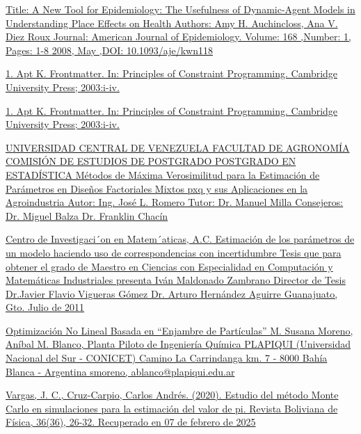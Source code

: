 \documentclass{article}
\begin{document}
\begin{itemize}
\begin{thebibliography}
     \bibitem[13]{}  \href{ https://doi.org/10.1093/aje/kwn118}{Title: A New Tool for Epidemiology: The Usefulness of Dynamic-Agent Models in Understanding Place Effects on Health Authors: Amy H. Auchincloss, Ana V. Diez Roux Journal: American Journal of Epidemiology. Volume: 168 ,Number: 1, Pages: 1-8 2008,  May ,DOI: 10.1093/aje/kwn118}
    \label{sec:23}

    \bibitem[15]{}  \href{https://www.cambridge.org/core/books/principles-of-constraint-programming/C008FB32571F66C3EE0EEEBDE1F98A7D}{1. Apt K. Frontmatter. In: Principles of Constraint Programming. Cambridge University Press; 2003:i-iv.}
    \label{sec:24}

    \bibitem[15]{}  \href{https://www.cambridge.org/core/books/principles-of-constraint-programming/C008FB32571F66C3EE0EEEBDE1F98A7D}{1. Apt K. Frontmatter. In: Principles of Constraint Programming. Cambridge University Press; 2003:i-iv.}
    \label{sec:25}

    \bibitem[16]{}  \href{http://saber.ucv.ve/bitstream/10872/14678/1/T026800014698-0-FinalDefensa_JoseLuisRomero-000.pdf}{UNIVERSIDAD CENTRAL DE VENEZUELA FACULTAD DE AGRONOMÍA COMISIÓN DE ESTUDIOS DE POSTGRADO POSTGRADO EN ESTADÍSTICA Métodos de Máxima Verosimilitud para la Estimación de Parámetros en Diseños
    Factoriales Mixtos pxq y sus Aplicaciones en la Agroindustria  Autor: Ing. José L. Romero Tutor: Dr. Manuel Milla Consejeros: Dr. Miguel Balza Dr. Franklin Chacín}
    \label{sec:26}

    \bibitem[17]{}\href{https://cimat.repositorioinstitucional.mx/jspui/bitstream/1008/255/2/TE%20388.pdf}{Centro de Investigaci´on en Matem´aticas, A.C. Estimación de los parámetros de un modelo haciendo uso de correspondencias con incertidumbre Tesis que para obtener el grado de Maestro en Ciencias con Especialidad en Computación y Matemáticas Industriales presenta Iván Maldonado Zambrano Director de Tesis Dr.Javier Flavio Vigueras Gómez Dr. Arturo Hernández Aguirre Guanajuato, Gto. Julio de 2011}
    \label{sec:27}

    \bibitem[18]  {}\href{https://cimat.repositorioinstitucional.mx/jspui/bitstream/1008/255/2/TE%20388.pdf}{Optimización No Lineal Basada en “Enjambre de Partículas” M. Susana Moreno, Aníbal M. Blanco, Planta Piloto de Ingeniería Química PLAPIQUI (Universidad Nacional del Sur - CONICET) Camino La Carrindanga km. 7 - 8000 Bahía Blanca - Argentina {smoreno, ablanco}@plapiqui.edu.ar}
    \label{sec:28}

    \bibitem[19]  {}\href{http://www.scielo.org.bo/scielo.php?script=sci_arttext&pid=S1562-38232020000100005&lng=es&tlng=es.}{Vargas, J. C., Cruz-Carpio, Carlos Andrés. (2020). Estudio del método Monte Carlo en simulaciones para la estimación del valor de pi. Revista Boliviana de Física, 36(36), 26-32. Recuperado en 07 de febrero de 2025}
    \label{sec:28}


\end{thebibliography}
\end{itemize}
\end{document}
